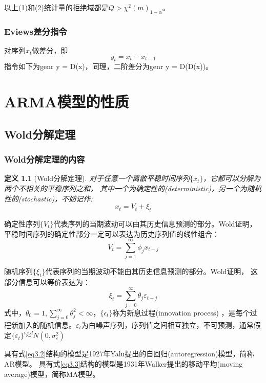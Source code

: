 \documentclass[12pt, a4paper, oneside]{ctexbook}
\newtheorem{definition}[theorem]{定义}
\begin{document}
以上(1)和(2)统计量的拒绝域都是$Q > \chi^2(m)_{1-\alpha}$。


\subsection{Eviews差分指令}
对序列$x_t$做差分，即
\begin{equation}
    y_t = x_t - x_{t-1}
\end{equation}
指令如下为genr y = D(x)，同理，二阶差分为genr y = D(D(x))。

\chapter{ARMA模型的性质}

\section{Wold分解定理}
\subsection{Wold分解定理的内容}
\begin{definition}[Wold分解定理]
    对于任意一个离散平稳时间序列$\{x_t\}$，它都可以分解为两个不相关的平稳序列之和，
    其中一个为确定性的(deterministic)，另一个为随机性的(stochastic)，不妨记作:
    \begin{equation}
        x_t = V_t+ \xi_t
    \end{equation}
\end{definition}
确定性序列$\{V_t\}$代表序列的当期波动可以由其历史信息预测的部分。Wold证明，
平稳时间序列的确定性部分一定可以表达为历史序列值的线性组合：
\begin{equation}\label{eq3.2}
    V_t = \sum_{j = 1}^{\infty}\phi_jx_{t-j}
\end{equation}

随机序列$\{\xi_t\}$代表序列的当期波动不能由其历史信息预测的部分。Wold证明，
这部分信息可以等价表达为：
\begin{equation}\label{eq3.3}
    \xi_t = \sum_{j = 0}^{\infty}\theta_j\varepsilon_{t-j}
\end{equation}
式中，$\theta_0 = 1,\sum_{j = 0}^{\infty}\theta_j^2<\infty$，$\{\epsilon_t\}$称为新息过程(innovation process)
，是每个过程新加入的随机信息。$\varepsilon_t$为白噪声序列，序列值之间相互独立，不可预测，通常假定$\{\varepsilon_t\}
    \stackrel{i.i.d}{\sim}N(0,\sigma_{\varepsilon}^{2})$

具有式\ref{eq3.2}结构的模型是1927年Yalu提出的自回归(autoregression)模型，简称AR模型。
具有式\ref{eq3.3}结构的模型是1931年Walker提出的移动平均(moving average)模型，简称MA模型。
\end{document}
